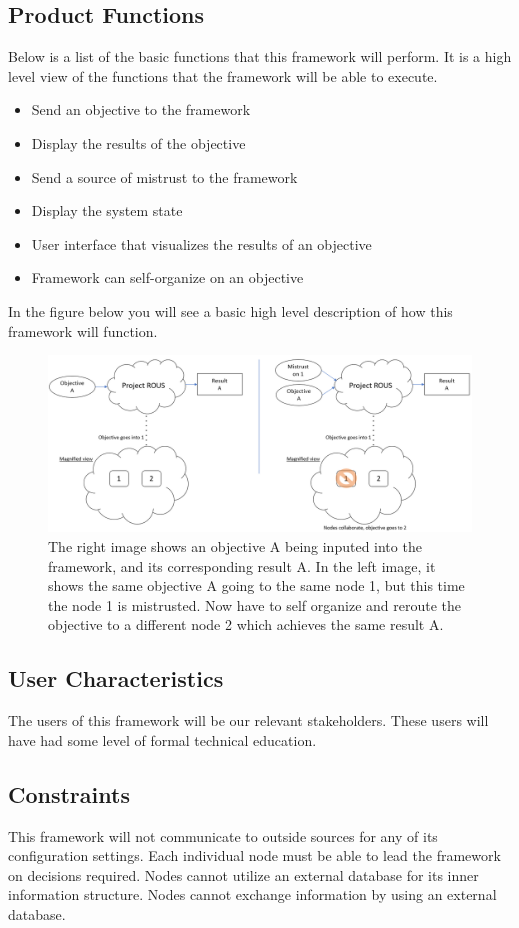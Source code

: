\documentclass[draftclsnofoot, onecolumn, compsoc, 10pt]{IEEEtran}
\begin{document}
\subsection{Product Functions}
Below is a list of the basic functions that this framework will perform. It is a high level view of the functions that the framework will be able to execute.
\begin{itemize}
\item Send an objective to the framework
\item Display the results of the objective
\item Send a source of mistrust to the framework
\item Display the system state 
\item User interface that visualizes the results of an objective
\item Framework can self-organize on an objective
\end{itemize}
In the figure below you will see a basic high level description of how this framework will function.
\begin{figure}[!htb]
  \centering
    \includegraphics[width=1.0\textwidth]{img_zoom}
  \caption{The right image shows an objective A being inputed into the framework, and its corresponding result A. In the left image, it shows the same objective A going to the same node 1, but this time the node 1 is mistrusted. Now have to self organize and reroute the objective to a different node 2 which achieves the same result A. }
\end{figure}
\FloatBarrier

\subsection{User Characteristics} 
The users of this framework will be our relevant stakeholders. These users will have had some level of formal technical education.

\subsection{Constraints}
This framework will not communicate to outside sources for any of its configuration settings. Each individual node must be able to lead the framework on decisions required. Nodes cannot utilize an external database for its inner information structure. Nodes cannot exchange information by using an external database.
\end{document}
